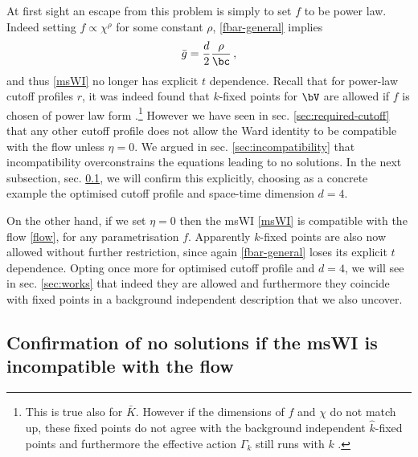\documentclass[11pt]{book} %
\newcommand{\be}{\begin{equation}}
\newcommand{\ee}{\end{equation}}
\newcommand{\bg}{\bar g}
\begin{document}
At first sight an escape from this problem is simply to set $f$ to be power law. Indeed setting $f\propto\chi^{\rho}$
for some constant $\rho$,  \eqref{fbar-general} implies
\be 
\bg = \frac{d}{2} \frac{\rho}{\bc}\,,
\label{powlaw-gamma}
\ee 
and thus \eqref{msWI} no longer has explicit $t$ dependence. 
Recall that for power-law cutoff profiles $r$, it was indeed found that $k$-fixed points for $\bV$ 
are allowed if $f$ is chosen of power law form \cite{Dietz:2015owa}.\footnote{This is true also for $\bar{K}$. However if the dimensions of $f$ and $\chi$
do not match up, %
these fixed points do not agree with the background independent $\hat{k}$-fixed points and furthermore  the effective action $\Gamma_k$ still runs with $k$ \cite{Dietz:2015owa}.} 
However we have seen in sec. \ref{sec:required-cutoff} that any other cutoff profile does not allow the Ward identity to be compatible with the flow unless $\eta=0$. We argued in sec. \ref{sec:incompatibility} that incompatibility overconstrains the equations leading to no solutions. In the next subsection, sec. \ref{sec:incompatible-no-solns}, we will confirm this explicitly, choosing as a concrete example the optimised cutoff profile and space-time dimension $d=4$.

On the other hand, if we set $\eta=0$ then the msWI \eqref{msWI} is compatible with the flow \eqref{flow}, for any parametrisation $f$. Apparently $k$-fixed points are also now allowed without further restriction, since again \eqref{fbar-general} loses its explicit $t$ dependence.  Opting once more for optimised cutoff profile and $d=4$, we will see in sec. \ref{sec:works} that indeed they are allowed and furthermore they coincide with fixed points in a background independent description that we also uncover. 



\subsection{Confirmation of no solutions if the msWI is incompatible with the flow}\label{sec:incompatible-no-solns}
\end{document}
